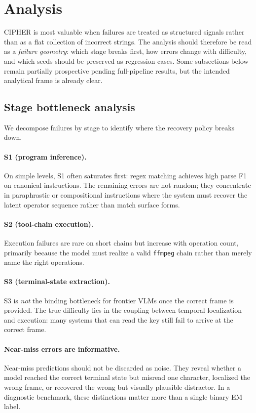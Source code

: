 \section{Analysis}
\label{sec:analysis}

CIPHER is most valuable when failures are treated as structured signals rather
than as a flat collection of incorrect strings. The analysis should therefore
be read as a \emph{failure geometry}: which stage breaks first, how errors
change with difficulty, and which seeds should be preserved as regression
cases. Some subsections below remain partially prospective pending
full-pipeline results, but the intended analytical frame is already clear.

\subsection{Stage bottleneck analysis}

We decompose failures by stage to identify where the recovery policy breaks
down.

\paragraph{S1 (program inference).}
On simple levels, S1 often saturates first: regex matching achieves high parse
F1 on canonical instructions. The remaining errors are not random; they
concentrate in paraphrastic or compositional instructions where the system must
recover the latent operator sequence rather than match surface forms.

\paragraph{S2 (tool-chain execution).}
Execution failures are rare on short chains but increase with operation count,
primarily because the model must realize a valid \texttt{ffmpeg} chain rather
than merely name the right operations.

\paragraph{S3 (terminal-state extraction).}
S3 is \emph{not} the binding bottleneck for frontier VLMs once the correct
frame is provided. The true difficulty lies in the coupling between temporal
localization and execution: many systems that can read the key still fail to
arrive at the correct frame.

\paragraph{Near-miss errors are informative.}
Near-miss predictions should not be discarded as noise. They reveal whether a
model reached the correct terminal state but misread one character, localized
the wrong frame, or recovered the wrong but visually plausible distractor. In a
diagnostic benchmark, these distinctions matter more than a single binary EM
label.

